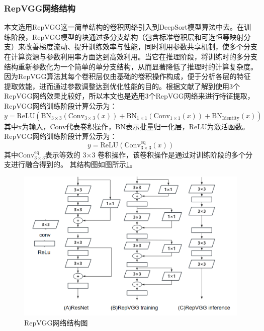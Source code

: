 \subsubsection{RepVGG网络结构}

本文选用RepVGG\cite{KXJS202307031}这一简单结构的卷积网络引入到DeepSort模型算法中去。在训练阶段，RepVGG模型的块通过多分支结构（包含标准卷积层和可选恒等映射分支）来改善梯度流动、提升训练效率与性能，同时利用参数共享机制，使多个分支在计算资源与参数利用率方面达到高效利用。当它在推理阶段，将训练时的多分支结构重新参数化为一个简单的单分支结构，从而显著降低了推理时的计算复杂度。因为RepVGG算法其每个卷积层仅由基础的卷积操作构成，便于分析各层的特征提取效能，进而通过参数调整达到优化性能的目的。根据文献\cite{KJPL202501006}了解到使用3个RepVGG网络效果比较好，所以本文也是选用3个RepVGG网络来进行特征提取，RepVGG网络训练阶段计算公示为：\[y = \text{ReLU}\left( \text{BN}_{3\times3}(\text{Conv}_{3\times3}(x)) + \text{BN}_{1\times1}(\text{Conv}_{1\times1}(x)) + \text{BN}_{\text{Identity}}(x) \right)\]
其中x为输入，Conv代表卷积操作，BN表示批量归一化层，ReLU为激活函数。
RepVGG网络训练阶段计算公示为：\[y = \text{ReLU}\left( \text{Conv}_{3\times3}^{\text{eq}}(x) \right)\]
其中\(\text{Conv}_{3\times3}^{\text{eq}}\)表示等效的 3×3 卷积操作，该卷积操作是通过对训练阶段的多个分支进行融合得到的。
其结构图如图所示\ref{fig:np16}。


\begin{figure}[htbp] %
	\centering
	\includegraphics[width=1\textwidth]{np16} %
	\caption{RepVGG网络结构图} %
	\label{fig:np16} %
\end{figure}

